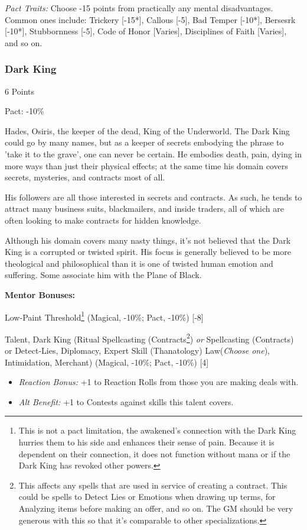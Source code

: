 \begin{multicols}{3}
	
	\textit{Pact Traits:} Choose -15 points from practically any mental disadvantages. Common ones include: Trickery [-15*], Callous [-5], Bad Temper [-10*], Bersesrk [-10*], Stubbornness [-5], Code of Honor [Varies], Disciplines of Faith [Varies], and so on.
	
	\subsubsection{Dark King}
	\begin{flushright}
		6 Points
	\end{flushright}
	Pact: -10\%
	
	Hades, Osiris, the keeper of the dead, King of the Underworld. The Dark King could go by many names, but as a keeper of secrets embodying the phrase to 'take it to the grave', one can never be certain. He embodies death, pain, dying in more ways than just their physical effects; at the same time his domain covers secrets, mysteries, and contracts most of all.
	
	His followers are all those interested in secrets and contracts. As such, he tends to attract many business suits, blackmailers, and inside traders, all of which are often looking to make contracts for hidden knowledge.
	
	Although his domain covers many nasty things, it's not believed that the Dark King is a corrupted or twisted spirit. His focus is generally believed to be more theological and philosophical than it is one of twisted human emotion and suffering. Some associate him with the Plane of Black.
	
	\textbf{Mentor Bonuses:} 
	
	Low-Paint Threshold\footnote{This is not a pact limitation, the awakened's connection with the Dark King hurries them to his side and enhances their sense of pain. Because it is dependent on their connection, it does not function without mana or if the Dark King has revoked other powers.} (Magical, -10\%; Pact, -10\%) [-8] 
	
	Talent, Dark King (Ritual Spellcasting (Contracts\footnote{This affects any spells that are used in service of creating a contract. This could be spells to Detect Lies or Emotions when drawing up terms, for Analyzing items before making an offer, and so on. The GM should be very generous with this so that it's comparable to other specializations.}) \textit{or} Spellcasting (Contracts) or Detect-Lies, Diplomacy, Expert Skill (Thanatology) Law(\textit{Choose one}), Intimidation, Merchant) (Magical, -10\%; Pact, -10\%) [4]
	\begin{itemize}
		\itemsep 0pt
		\item \textit{Reaction Bonus:} +1 to Reaction Rolls from those you are making deals with.
		\item \textit{Alt Benefit:} +1 to Contests against skills this talent covers.
	\end{itemize}
	

\end{multicols}
